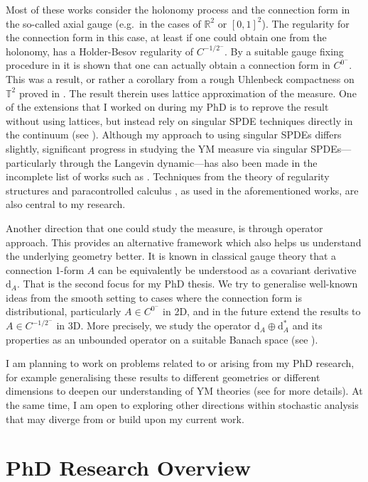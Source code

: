 \documentclass[11pt]{article}
\numberwithin{equation}{section}
\theoremstyle{definition}
\theoremstyle{remark}
\newcommand{\diff}{\mathrm{d}}
\newcommand{\R}{\mathbb R}
\newcommand{\1}{\mathbf 1}
\newcommand{\<}{\langle}
\renewcommand{\>}{\rangle}
\newcommand{\bT}{\mathbb T}
\begin{document}
Most of these works consider the holonomy process and the connection form in the so-called axial gauge (e.g.\ in the cases of $\R^2$ or $[0,1]^2$). The regularity for the connection form in this case, at least if one could obtain one from the holonomy, has a Holder-Besov regularity of $C^{-1/2^-}$. By a suitable gauge fixing procedure in \cite{Chevyrev19} it is shown that one can actually obtain a connection form in $C^{0^-}$. This was a result, or rather a corollary from a rough Uhlenbeck compactness on $\bT^2$ proved in \cite{Chevyrev19}. The result therein uses lattice approximation of the measure. One of the extensions that I worked on during my PhD is to reprove the result without using lattices, but instead rely on singular SPDE techniques directly in the continuum (see  ). Although my approach to using singular SPDEs differs slightly, significant progress in studying the YM measure via singular SPDEs—particularly through the Langevin dynamic—has also been made in the incomplete list of works such as  \cite{CCHS2d,CCHS3d,CH23,BC23,BC24}. Techniques from the theory of regularity structures \cite{Hairer14} and paracontrolled calculus \cite{GIP15}, as used in the aforementioned works, are also central to my research. 

Another direction that one could study the measure, is through operator approach. This provides an alternative framework which also helps us understand the underlying geometry better. It is known in classical gauge theory that a connection 1-form $A$ can be equivalently be understood as a covariant derivative $\diff_A$. That is the second focus for my PhD thesis. We try to generalise well-known ideas from the smooth setting to cases where the connection form is distributional, particularly $A\in C^{0^-}$ in 2D, and in the future extend the results to $A\in C^{-1/2^-}$ in 3D. More precisely, we study the operator $\diff_A\oplus\diff_A^*$ and its properties as an unbounded operator on a suitable Banach space (see ). 

I am planning to work on problems related to or arising from my PhD research, for example generalising these results to different geometries or different dimensions to deepen our understanding of YM theories (see  for more details).  At the same time, I am open to exploring other directions within stochastic analysis that may diverge from or build upon my current work.

\section{PhD Research Overview}
\end{document}

